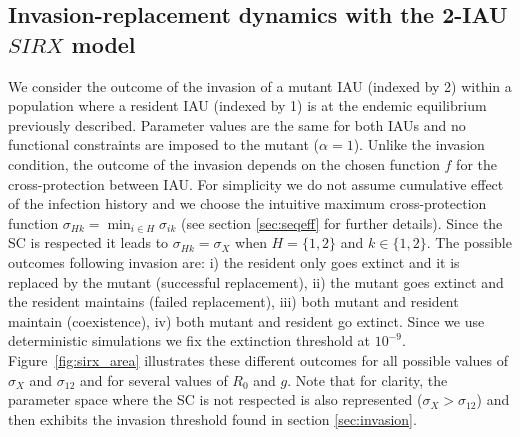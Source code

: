 \subsection{Invasion-replacement dynamics with the 2-IAU $SIRX$ model}
\label{sec:replacement}
We consider the outcome of the invasion of a mutant IAU (indexed by 2)
within a population where a resident IAU (indexed by 1) is at the
endemic equilibrium previously described. Parameter values are the
same for both IAUs and no functional constraints are imposed to the
mutant ($\alpha=1$). Unlike the invasion condition, the outcome of the
invasion depends on the chosen function $f$ for the cross-protection
between IAU. For simplicity we do not assume cumulative effect of the
infection history and we choose the intuitive maximum cross-protection
function $\sigma_{Hk}=\min_{i\in H}\sigma_{ik}$ (see section
\ref{sec:seqeff} for further details). Since the SC is respected it
leads to $\sigma_{Hk}=\sigma_{X}$ when $H=\{1,2\}$ and $k\in\{1,2\}$.
The possible outcomes following invasion are: i) the resident only
goes extinct and it is replaced by the mutant (successful
replacement), ii) the mutant goes extinct and the resident maintains
(failed replacement), iii) both mutant and resident maintain
(coexistence), iv) both mutant and resident go extinct. Since we use
deterministic simulations we fix the extinction threshold at
$10^{-9}$. Figure~\ref{fig:sirx_area} illustrates these different
outcomes for all possible values of $\sigma_{X}$ and $\sigma_{12}$ and
for several values of $R_{0}$ and $g$. Note that for clarity, the
parameter space where the SC is not respected is also represented
($\sigma_{X}>\sigma_{12}$) and then exhibits the invasion threshold
found in section \ref{sec:invasion}.


